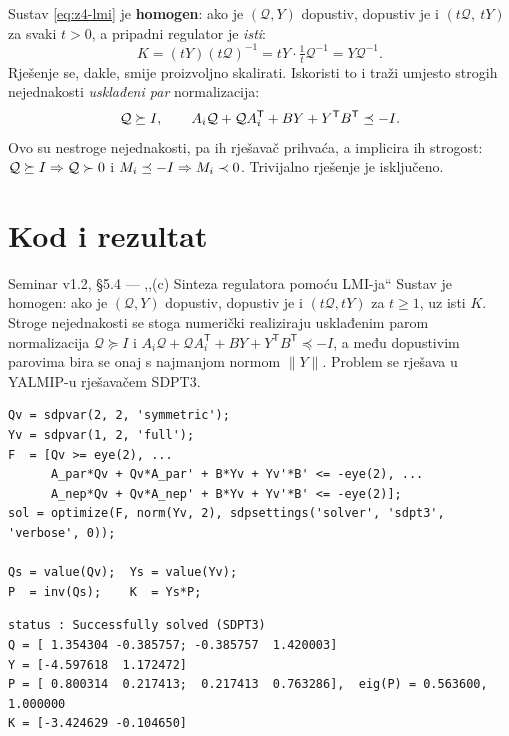 \begin{korak}
Sustav \eqref{eq:z4-lmi} je \textbf{homogen}: ako je $(\mathcal{Q}, Y)$ dopustiv,
dopustiv je i $(t\mathcal{Q},\ tY)$ za svaki $t > 0$, a pripadni regulator je
\emph{isti}:
\begin{equation}
K = (tY)(t\mathcal{Q})^{-1} = t Y \cdot \tfrac1t \mathcal{Q}^{-1} = Y\mathcal{Q}^{-1}.
\end{equation}
Rješenje se, dakle, smije proizvoljno skalirati. Iskoristi to i traži umjesto
strogih nejednakosti \emph{usklađeni par} normalizacija:
\begin{equation}
\mathcal{Q} \succeq I, \qquad
A_i\mathcal{Q} + \mathcal{Q}A_i^{\mathsf{T}} + BY + Y^{\mathsf{T}} B^{\mathsf{T}} \preceq -I .
\label{eq:z4-normalizirano}
\end{equation}
Ovo su nestroge nejednakosti, pa ih rješavač prihvaća, a implicira ih strogost:
$\mathcal{Q} \succeq I \Rightarrow \mathcal{Q} \succ 0$ i
$M_i \preceq -I \Rightarrow M_i \prec 0$. Trivijalno rješenje je isključeno.
\end{korak}

\section{Kod i rezultat}
\label{sec:z4-kod}

\begin{seminar}{Seminar v1.2, §5.4 --- ,,(c) Sinteza regulatora pomoću LMI-ja``}
Sustav je homogen: ako je $(\mathcal{Q}, Y)$ dopustiv, dopustiv je i
$(t\mathcal{Q}, tY)$ za $t \geq 1$, uz isti $K$. Stroge nejednakosti se stoga
numerički realiziraju usklađenim parom normalizacija $\mathcal{Q} \succeq I$ i
$A_i \mathcal{Q} + \mathcal{Q}A_i^{\mathsf{T}} + BY + Y^{\mathsf{T}}B^{\mathsf{T}} \preceq -I$,
a među dopustivim parovima bira se onaj s najmanjom normom $\|Y\|$. Problem se
rješava u YALMIP-u rješavačem SDPT3.

\begin{lstlisting}[style=matlabstyle]
Qv = sdpvar(2, 2, 'symmetric');
Yv = sdpvar(1, 2, 'full');
F  = [Qv >= eye(2), ...
      A_par*Qv + Qv*A_par' + B*Yv + Yv'*B' <= -eye(2), ...
      A_nep*Qv + Qv*A_nep' + B*Yv + Yv'*B' <= -eye(2)];
sol = optimize(F, norm(Yv, 2), sdpsettings('solver', 'sdpt3', 'verbose', 0));

Qs = value(Qv);  Ys = value(Yv);
P  = inv(Qs);    K  = Ys*P;
\end{lstlisting}

\begin{lstlisting}[style=outputstyle]
status : Successfully solved (SDPT3)
Q = [ 1.354304 -0.385757; -0.385757  1.420003]
Y = [-4.597618  1.172472]
P = [ 0.800314  0.217413;  0.217413  0.763286],  eig(P) = 0.563600, 1.000000
K = [-3.424629 -0.104650]
\end{lstlisting}
\end{seminar}

